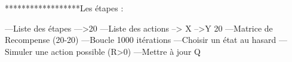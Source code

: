 ******************Les étapes :

---Liste des étapes --->20
---Liste des actions --> X -->Y  20
---Matrice de Recompense   (20-20)
---Boucle 1000 itérations
---Choisir un état au hasard
---Simuler une action possible (R>0)
---Mettre à jour Q